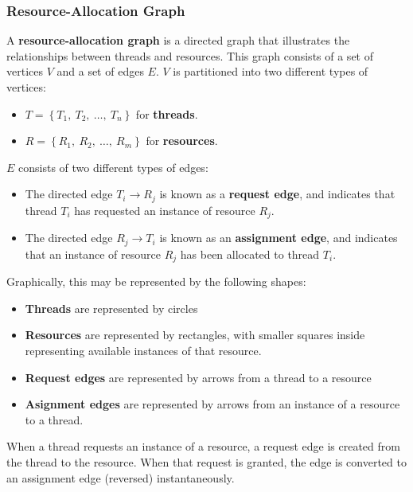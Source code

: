 \documentclass{article}
\begin{document}
\subsubsection{Resource-Allocation Graph}
A \textbf{resource-allocation graph} is a directed graph that
illustrates the relationships between threads and resources. This graph
consists of a set of vertices \(V\) and a set of edges \(E\). \(V\) is
partitioned into two different types of vertices:
\begin{itemize}
    \item \(T = \left\{ T_1,\: T_2,\: \ldots,\: T_n \right\}\) for \textbf{threads}.
    \item \(R = \left\{ R_1,\: R_2,\: \ldots,\: R_m \right\}\) for \textbf{resources}.
\end{itemize}
\(E\) consists of two different types of edges:
\begin{itemize}
    \item The directed edge \(T_i \rightarrow R_j\) is known as a
          \textbf{request edge}, and indicates that thread \(T_i\) has
          requested an instance of resource \(R_j\).
    \item The directed edge \(R_j \rightarrow T_i\) is known as an
          \textbf{assignment edge}, and indicates that an instance of
          resource \(R_j\) has been allocated to thread \(T_i\).
\end{itemize}
Graphically, this may be represented by the following shapes:
\begin{itemize}
    \item \textbf{Threads} are represented by circles
    \item \textbf{Resources} are represented by rectangles, with smaller
          squares inside representing available instances of that resource.
    \item \textbf{Request edges} are represented by arrows from a thread to a resource
    \item \textbf{Asignment edges} are represented by arrows from an instance of a
          resource to a thread.
\end{itemize}
When a thread requests an instance of a resource, a request edge is
created from the thread to the resource. When that request is granted,
the edge is converted to an assignment edge (reversed) instantaneously.
\end{document}
